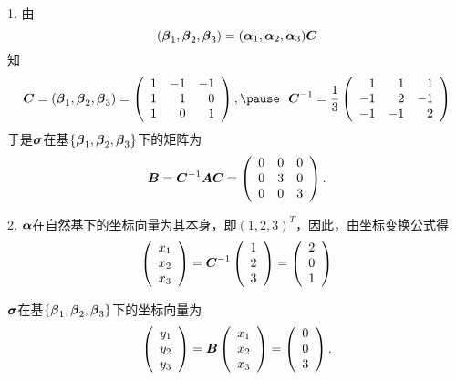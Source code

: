 \begin{frame}
  \begin{jie}
    1. 由
    $$
    (\boldsymbol{\beta}_1,\boldsymbol{\beta}_2,\boldsymbol{\beta}_3)=(\boldsymbol{\alpha}_1,\boldsymbol{\alpha}_2,\boldsymbol{\alpha}_3)\boldsymbol{C}
    $$
    知
    $$
    \MC=(\betabd_1,\betabd_2,\betabd_3)=\left(
      \begin{array}{rrr}
        1&-1&-1\\
        1&1&0\\
        1&0&1
      \end{array}
    \right), \pause~~ 
    \MC^{-1}=\frac13\left(
      \begin{array}{rrr}
        1&1&1\\
        -1&2&-1\\
        -1&-1&2
      \end{array}
    \right)
    $$
    于是$\boldsymbol{\sigma}$在基$\{\boldsymbol{\beta}_1,\boldsymbol{\beta}_2,\boldsymbol{\beta}_3\}$下的矩阵为
    $$
    \boldsymbol{B}=\boldsymbol{C}^{-1}\boldsymbol{A}\boldsymbol{C}=
    \left(
      \begin{array}{rrr}
        0&0&0\\
        0&3&0\\
        0&0&3
      \end{array}
    \right).
    $$
  \end{jie}
\end{frame}


\begin{frame}
  \begin{jie}
    2. $\boldsymbol{\alpha}$在自然基下的坐标向量为其本身，即$(1,2,3)^T$，因此，由坐标变换公式得
    $$
    \left(
      \begin{array}{c}
        x_1\\x_2\\x_3
      \end{array}
    \right)=\boldsymbol{C}^{-1}
    \left(
      \begin{array}{c}
        1\\2\\3
      \end{array}
    \right)=\left(
      \begin{array}{c}
        2\\0\\1
      \end{array}
    \right)
    $$\pause 

    $\boldsymbol{\sigma}$在基$\{\boldsymbol{\beta}_1,\boldsymbol{\beta}_2,\boldsymbol{\beta}_3\}$下的坐标向量为
    $$
    \left(
      \begin{array}{c}
        y_1\\y_2\\y_3
      \end{array}
    \right)=\boldsymbol{B}
    \left(
      \begin{array}{c}
        x_1\\x_2\\x_3
      \end{array}
    \right)=\left(
      \begin{array}{c}
        0\\0\\3
      \end{array}
    \right).
    $$
  \end{jie}
\end{frame}


